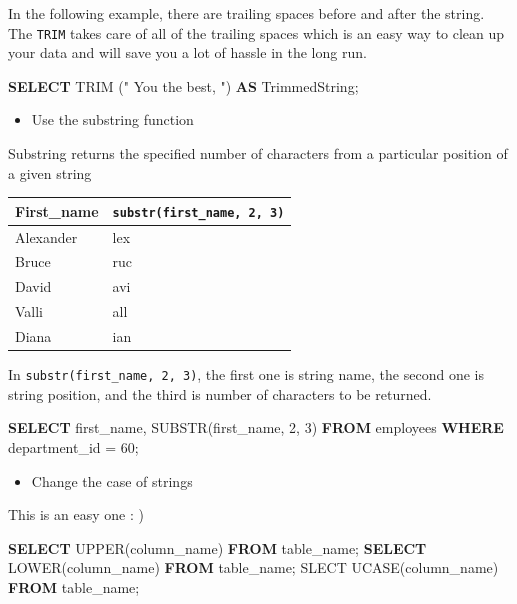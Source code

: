 \documentclass[]{book}
\newenvironment{Shaded}{\begin{snugshade}}{\end{snugshade}}
\newcommand{\KeywordTok}[1]{\textcolor[rgb]{0.13,0.29,0.53}{\textbf{{#1}}}}
\newcommand{\DecValTok}[1]{\textcolor[rgb]{0.00,0.00,0.81}{{#1}}}
\newcommand{\OtherTok}[1]{\textcolor[rgb]{0.56,0.35,0.01}{{#1}}}
\newcommand{\FunctionTok}[1]{\textcolor[rgb]{0.00,0.00,0.00}{{#1}}}
\newcommand{\NormalTok}[1]{{#1}}
\providecommand{\tightlist}{%
  \setlength{\itemsep}{0pt}\setlength{\parskip}{0pt}}
\theoremstyle{definition}
\theoremstyle{definition}
\theoremstyle{remark}
\begin{document}
In the following example, there are trailing spaces before and after the
string. The \texttt{TRIM} takes care of all of the trailing spaces which
is an easy way to clean up your data and will save you a lot of hassle
in the long run.

\begin{Shaded}
\begin{Highlighting}[]
\KeywordTok{SELECT} \FunctionTok{TRIM} \NormalTok{(}\OtherTok{"  You the best,      "}\NormalTok{)  }\KeywordTok{AS} \NormalTok{TrimmedString;}
\end{Highlighting}
\end{Shaded}

\begin{itemize}
\tightlist
\item
  Use the substring function
\end{itemize}

Substring returns the specified number of characters from a particular
position of a given string

\begin{longtable}[]{@{}ll@{}}
\toprule
First\_name & \texttt{substr(first\_name,\ 2,\ 3)}\tabularnewline
\midrule
\endhead
Alexander & lex\tabularnewline
Bruce & ruc\tabularnewline
David & avi\tabularnewline
Valli & all\tabularnewline
Diana & ian\tabularnewline
\bottomrule
\end{longtable}

In \texttt{substr(first\_name,\ 2,\ 3)}, the first one is string name,
the second one is string position, and the third is number of characters
to be returned.

\begin{Shaded}
\begin{Highlighting}[]
\KeywordTok{SELECT} \NormalTok{first_name, }\FunctionTok{SUBSTR}\NormalTok{(first_name, }\DecValTok{2}\NormalTok{, }\DecValTok{3}\NormalTok{)}
\KeywordTok{FROM} \NormalTok{employees}
\KeywordTok{WHERE} \NormalTok{department_id = }\DecValTok{60}\NormalTok{;}
\end{Highlighting}
\end{Shaded}

\begin{itemize}
\tightlist
\item
  Change the case of strings
\end{itemize}

This is an easy one : )

\begin{Shaded}
\begin{Highlighting}[]
\KeywordTok{SELECT} \FunctionTok{UPPER}\NormalTok{(column_name) }\KeywordTok{FROM} \NormalTok{table_name;}
\KeywordTok{SELECT} \FunctionTok{LOWER}\NormalTok{(column_name) }\KeywordTok{FROM} \NormalTok{table_name;}
\NormalTok{SLECT UCASE(column_name) }\KeywordTok{FROM} \NormalTok{table_name;}
\end{Highlighting}
\end{Shaded}
\end{document}

